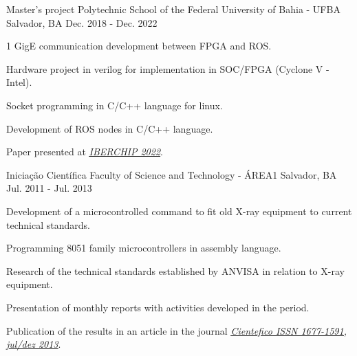 \begin{cventries}
  \cventry
    {Master's project} %
    {Polytechnic School of the Federal University of Bahia - UFBA} %
    {Salvador, BA} %
    {Dec. 2018 - Dec. 2022} %
    {
      \begin{cvitems} %
        \item {1 GigE communication development between FPGA and ROS.}
        \item {Hardware project in verilog for implementation in SOC/FPGA (Cyclone V - Intel).}
        \item {Socket programming in C/C++ language for linux.}
        \item {Development of ROS nodes in C/C++ language.}
        \item {Paper presented at \underline{\href{https://ieee-lascas.org/}{\emph{IBERCHIP 2022}}}.}
      \end{cvitems}
    }

  \cventry
    {Iniciação Científica} %
    {Faculty of Science and Technology - ÁREA1} %
    {Salvador, BA} %
    {Jul. 2011 - Jul. 2013} %
    {
      \begin{cvitems} %
        \item {Development of a microcontrolled command to fit old X-ray equipment to current technical standards.}
        \item {Programming 8051 family microcontrollers in assembly language.}
        \item {Research of the technical standards established by ANVISA in relation to X-ray equipment.}
        \item {Presentation of monthly reports with activities developed in the period.}
        \item {Publication of the results in an article in the journal \underline{\href{https://cientefico.emnuvens.com.br/cientefico/article/view/58}{\emph{Cientefico ISSN 1677-1591, jul/dez 2013}}}.}
      \end{cvitems}
    }
    

\end{cventries}

